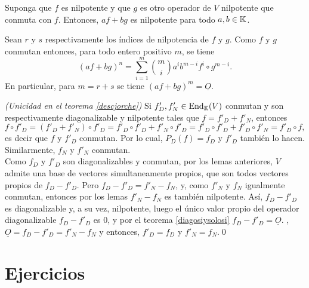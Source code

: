 \begin{lema}
  Suponga que $f$ es nilpotente y que $g$ es otro operador de $V$ nilpotente que conmuta con $f$. Entonces, $af+bg$ es nilpotente para todo $a,b\in\mathbb{K}$.
\end{lema}

\dem Sean $r$ y $s$ respectivamente los índices de nilpotencia de $f$ y $g$. Como $f$ y $g$ conmutan entonces, para todo entero positivo $m$, se tiene
$$ (af+bg)^n=\sum_{i=1}^m\binom{m}{i}a^ib^{m-i}f^i\circ g^{m-i}.$$
En particular, para $m=r+s$ se tiene $(af+bg)^m=\underline{O}$.

\dem\emph{(Unicidad en el teorema \ref{descjorche})} Si $f'_D,f'_N\in\operatorname{End}_{\mathbb{K}}(V)$ conmutan y son respectivamente diagonalizable y nilpotente tales que $f=f'_D+f'_N$, entonces
  \[
  f\circ f'_D=(f'_D+f'_N)\circ f'_D=f'_D\circ f'_D+f'_N\circ f'_D=f'_D\circ f'_D+f'_D\circ f'_N=f'_D\circ f,
  \]
  es decir que $f$ y $f'_D$ conmutan. Por lo cual, $P_D(f)=f_D$ y $f'_D$ tambi\'en lo hacen. Similarmente, $f_N$ y $f'_N$ conmutan.\\
  Como $f_D$ y $f'_D$ son diagonalizables y conmutan, por los lemas anteriores, $V$ admite una base de vectores simultaneamente propios, que son todos vectores propios de $f_D-f'_D$. Pero $f_D-f'_D=f'_N-f_N$, y, como $f'_N$ y $f_N$ igualmente conmutan, entonces por los lemas $f'_N-f_N$ es también nilpotente. As\'i, $f_D-f'_D$ es diagonalizable y, a su vez, nilpotente, luego el único valor propio del operador diagonalizable $f_D-f'_D$ es $0$, y por el teorema \ref{diagosiysolosi} $f_D-f'_D=\underline{O}$. , $\underline{O}=f_D-f'_D=f'_N-f_N$ y entonces, $f'_D=f_D$ y $f'_N=f_N$.\qed

  \section*{Ejercicios}

